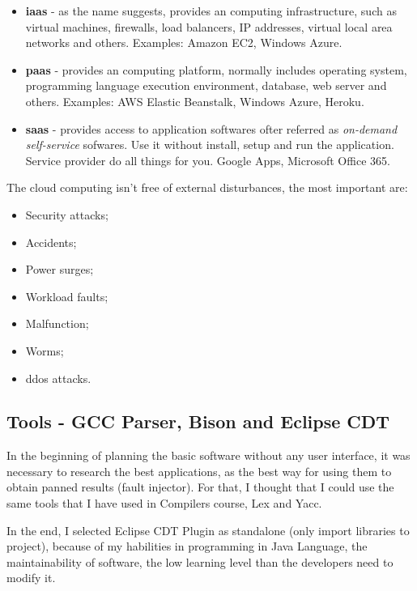 \begin{itemize}
	\item \textbf{\ac{iaas}} - as the name suggests, provides an computing infrastructure, such as virtual machines, firewalls, load balancers, IP addresses, virtual local area networks and others. Examples: Amazon EC2, Windows Azure.

	\item \textbf{\ac{paas}} - provides an computing platform, normally includes operating system, programming language execution environment, database, web server and others. Examples: AWS Elastic Beanstalk, Windows Azure, Heroku.

	\item \textbf{\ac{saas}} - provides access to application softwares ofter referred as \textit{on-demand self-service} sofwares. Use it without install, setup and run the application. Service provider do all things for you. Google Apps, Microsoft Office 365.

\end{itemize}

The cloud computing isn't free of external disturbances\cite{wolter2012resilience}, the most important are:
\begin{itemize}
 	\item Security attacks;
 	\item Accidents;
 	\item Power surges;
 	\item Workload faults;
 	\item Malfunction;
 	\item Worms;
 	\item \ac{ddos} attacks.
 \end{itemize}


\subsection{Tools - GCC Parser, Bison and Eclipse CDT}

In the beginning of planning the basic software without any user interface, it was necessary to research the best applications, as the best way for using them to obtain panned results (fault injector).
For that, I thought that I could use the same tools that I have used in Compilers course, Lex and Yacc.


In the end, I selected Eclipse CDT Plugin as standalone (only import libraries to project), because of my habilities in programming in Java Language, the maintainability of software, the low learning level than the developers need to modify it.\\

